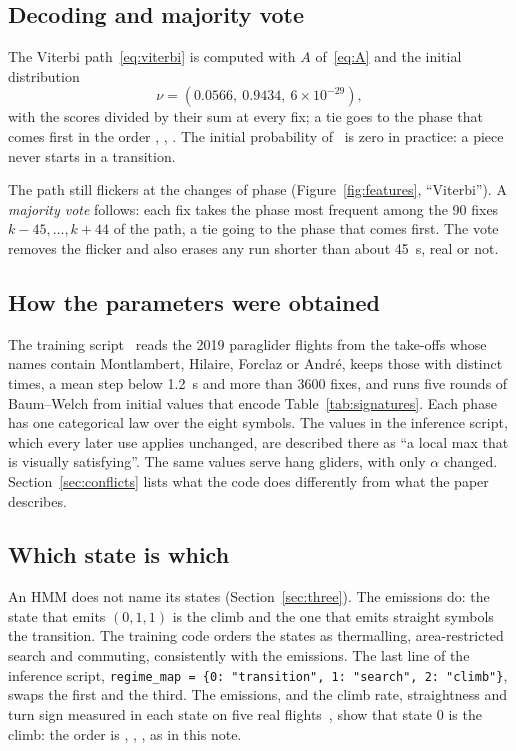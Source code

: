 \subsection{Decoding and majority vote}\label{sec:decoding}

The Viterbi path~\eqref{eq:viterbi} is computed with $A$ of~\eqref{eq:A} and the initial
distribution
\[
  \nu=(0.0566,\ 0.9434,\ 6\times10^{-29}),
\]
with the scores divided by their sum at every fix; a tie goes to the phase that comes first in the
order \cl, \se, \tr. The initial probability of \tr\ is zero in practice: a piece never starts
in a transition.

The path still flickers at the changes of phase (Figure~\ref{fig:features}, ``Viterbi''). A
\emph{majority vote} follows: each fix takes the phase most frequent among the 90 fixes
$k-45,\dots,k+44$ of the path, a tie going to the phase that comes first. The vote removes the
flicker and also erases any run shorter than about 45~s, real or not.

\subsection{How the parameters were obtained}\label{sec:training}

The training script~\cite{vilpellet2025code} reads the 2019 paraglider flights from the take-offs
whose names contain Montlambert, Hilaire, Forclaz or André, keeps those with distinct
times, a mean step below 1.2~s and more than 3600 fixes, and runs five rounds of Baum--Welch from
initial values that encode Table~\ref{tab:signatures}. Each phase has one categorical law over the
eight symbols. The values in the inference script, which every later use applies unchanged, are
described there as ``a local max that is visually satisfying''. The same values serve hang gliders,
with only $\alpha$ changed. Section~\ref{sec:conflicts} lists what the code does differently from
what the paper describes.

\subsection{Which state is which}\label{sec:naming}

An HMM does not name its states (Section~\ref{sec:three}). The emissions do: the state that emits
$(0,1,1)$ is the climb and the one that emits straight symbols the transition. The training code
orders the states as thermalling, area-restricted search and commuting, consistently with the
emissions. The last line of the inference script, \texttt{regime\_map = \{0: "transition", 1:
"search", 2: "climb"\}}, swaps the first and the third. The emissions, and the climb rate,
straightness and turn sign measured in each state on five real flights~\cite{legacyguide}, show that
state 0 is the climb: the order is \cl, \se, \tr, as in this note.
